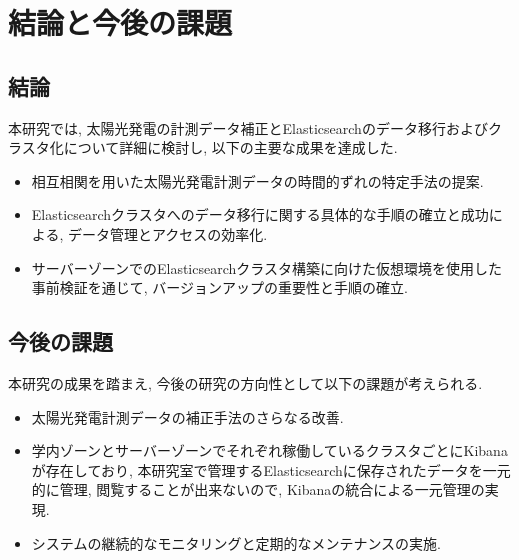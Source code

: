\chapter{結論と今後の課題}
\label{chap:fifth}

\section{結論}
本研究では, 太陽光発電の計測データ補正とElasticsearchのデータ移行およびクラスタ化について詳細に検討し, 以下の主要な成果を達成した.




\begin{itemize}
  \item 相互相関を用いた太陽光発電計測データの時間的ずれの特定手法の提案.
  \item Elasticsearchクラスタへのデータ移行に関する具体的な手順の確立と成功による, データ管理とアクセスの効率化.
  \item サーバーゾーンでのElasticsearchクラスタ構築に向けた仮想環境を使用した事前検証を通じて, バージョンアップの重要性と手順の確立.
\end{itemize}

\section{今後の課題}
本研究の成果を踏まえ, 今後の研究の方向性として以下の課題が考えられる.

\begin{itemize}
  \item 太陽光発電計測データの補正手法のさらなる改善.
  \item 学内ゾーンとサーバーゾーンでそれぞれ稼働しているクラスタごとにKibanaが存在しており, 本研究室で管理するElasticsearchに保存されたデータを一元的に管理, 閲覧することが出来ないので, Kibanaの統合による一元管理の実現.
  \item システムの継続的なモニタリングと定期的なメンテナンスの実施.
\end{itemize}
